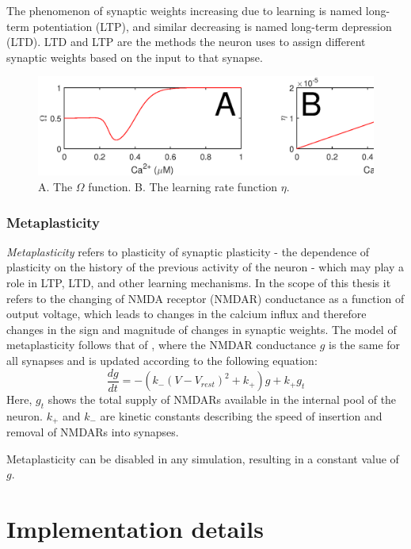 \documentclass[a4paper,12pt]{report}
\theoremstyle{definition}
\begin{document}
The phenomenon of synaptic weights increasing due to learning is named long-term potentiation (LTP), and similar decreasing is named long-term depression (LTD). LTD and LTP are the methods the neuron uses to assign different synaptic weights based on the input to that synapse.

\begin{figure}[h]
    \includegraphics[width=\textwidth]{figures/methods_eta_omega.eps}
    \caption{A. The $\Omega$ function. B. The learning rate function $\eta$.}
    \label{fig:methods_eta_omega}
\end{figure}


\subsubsection{Metaplasticity}
\emph{Metaplasticity} refers to plasticity of synaptic plasticity - the dependence of plasticity on the history of the previous activity of the neuron - which may play a role in LTP, LTD, and other learning mechanisms. In the scope of this thesis it refers to the changing of NMDA receptor (NMDAR) conductance as a function of output voltage, which leads to changes in the calcium influx and therefore changes in the sign and magnitude of changes in synaptic weights. The model of metaplasticity follows that of \cite{yeung2004synaptic}, where the NMDAR conductance $g$ is the same for all synapses and is updated according to the following equation: $$ \frac{dg}{dt}=-(k_- (V-V_{rest})^2 + k_+)g + k_+ g_t $$
Here, $g_t$ shows the total supply of NMDARs available in the internal pool of the neuron. $k_+$ and $k_-$ are kinetic constants describing the speed of insertion and removal of NMDARs into synapses.

Metaplasticity can be disabled in any simulation, resulting in a constant value of $g$.





\section{Implementation details}
\end{document}
